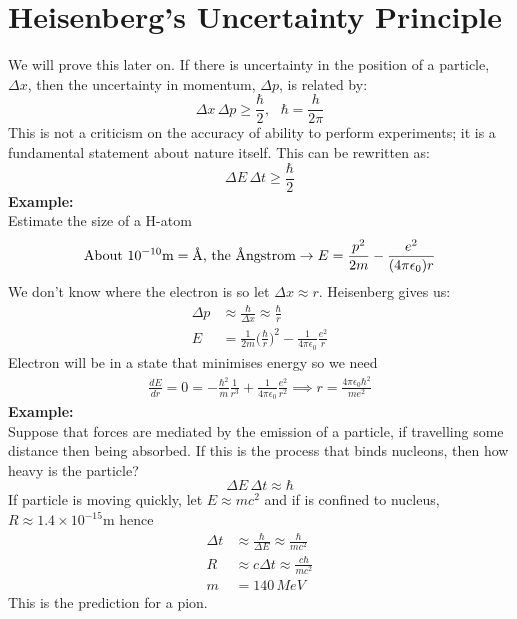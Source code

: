 \documentclass[a4paper, 11pt, normalem]{report}
\begin{document}
\section{Heisenberg's Uncertainty Principle}
We will prove this later on.
If there is uncertainty in the position of a particle, $\Delta x$, then the uncertainty in momentum, $\Delta p$, is related by:
\begin{equation}
    \Delta x\,\Delta p \geq \frac{\hbar}{2},~~~\hbar = \frac{h}{2\pi}
\end{equation}
This is not a criticism on the accuracy of ability to perform experiments; it is a fundamental statement about nature itself.
This can be rewritten as:
\begin{equation}
    \Delta E\,\Delta t \geq \frac{\hbar}{2}
\end{equation}
\textbf{Example:}\\
Estimate the size of a H-atom
\begin{align}
    \text{About }10^{-10}\text{m} = \text{\r{A}, the \r{A}ngstrom} \to  E = \frac{p^{2}}{2m} - \frac{e^{2}}{(4\pi\epsilon_{0})r}
\end{align}
We don't know where the electron is so let $\Delta x \approx r$.
Heisenberg gives us:
\begin{align}
    \Delta p &\approx \frac{\hbar}{\Delta x} \approx \frac{\hbar}{r} \\
    E &= \frac{1}{2m}\Big(\frac{\hbar}{r}\Big)^{2} - \frac{1}{4\pi\epsilon_{0}}\frac{e^{2}}{r}
\end{align}
Electron will be in a state that minimises energy so we need
\begin{align}
    \frac{dE}{dr} = 0 = -\frac{\hbar^{2}}{m}\frac{1}{r^{3}} + \frac{1}{4\pi\epsilon_{0}}\frac{e^{2}}{r^{2}} \implies r = \frac{4\pi\epsilon_{0}\hbar^{2}}{me^{2}}
\end{align}
\textbf{Example:}\\
Suppose that forces are mediated by the emission of a particle, if travelling some distance then being absorbed.
If this is the process that binds nucleons, then how heavy is the particle?
\begin{equation}
    \Delta E\,\Delta t \approx \hbar
\end{equation}
If particle is moving quickly, let $E \approx mc^{2}$ and if is confined to nucleus, $R \approx 1.4\times10^{-15}$m hence
\begin{align}
    \Delta t &\approx \frac{\hbar}{\Delta E} \approx \frac{\hbar}{mc^{2}} \\
    R &\approx c\Delta t \approx \frac{c\hbar}{mc^{2}} \\
    m &= 140\,MeV
\end{align}
This is the prediction for a pion.
\end{document}
